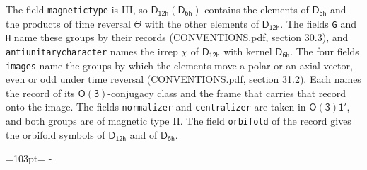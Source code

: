 \documentclass[10pt,a4paper]{article}
\newcommand{\needspace}[1]{\par\penalty-100\begingroup\dimen0=#1\relax\dimen2=\pagegoal
  \advance\dimen2-\pagetotal\ifdim\dimen0>\dimen2\relax\ifdim\dimen2>0pt\vfil\break\fi\fi
  \endgroup}
\numberwithin{equation}{section}
\newcommand{\grp}[1]{\mathsf{#1}}
\begin{document}
The field \texttt{magnetictype} is III, so $\grp{D_{12h}}(\grp{D_{6h}})$ contains the elements of $\grp{D_{6h}}$ and the products of time reversal $\varTheta$ with the other elements of $\grp{D_{12h}}$. The fields \texttt{G} and \texttt{H} name these groups by their records (\href{../../CONVENTIONS.pdf}{CONVENTIONS.pdf}, section \href{../../CONVENTIONS.pdf\#conv.30.3}{30.3}), and \texttt{antiunitarycharacter} names the irrep $\chi$ of $\grp{D_{12h}}$ with kernel $\grp{D_{6h}}$. The four fields \texttt{images} name the groups by which the elements move a polar or an axial vector, even or odd under time reversal (\href{../../CONVENTIONS.pdf}{CONVENTIONS.pdf}, section \href{../../CONVENTIONS.pdf\#conv.31.2}{31.2}). Each names the record of its $\grp{O(3)}$-conjugacy class and the frame that carries that record onto the image. The fields \texttt{normalizer} and \texttt{centralizer} are taken in $\grp{O(3)1'}$, and both groups are of magnetic type II. The field \texttt{orbifold} of the record gives the orbifold symbols of $\grp{D_{12h}}$ and of $\grp{D_{6h}}$.
\needspace{103pt}
\end{document}
